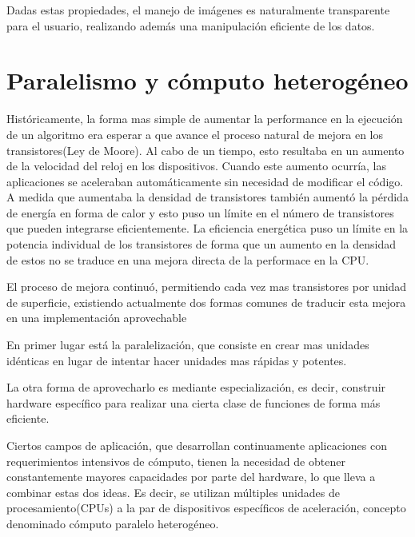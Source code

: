\documentclass[a4paper,10pt]{report}
\begin{document}
Dadas estas propiedades, el manejo de imágenes es naturalmente transparente para el usuario, realizando además una manipulación eficiente de los datos.










\section{Paralelismo y cómputo heterogéneo}



Históricamente, la forma mas simple de aumentar la performance en la ejecución de un algoritmo era esperar a que avance el proceso natural de mejora en los transistores(Ley de Moore).
Al cabo de un tiempo, esto resultaba en un aumento de la velocidad del reloj en los dispositivos. Cuando este aumento ocurría, las aplicaciones se aceleraban automáticamente sin necesidad de modificar el código.
A medida que aumentaba la densidad de transistores también aumentó la pérdida de energía en forma de calor y esto puso un límite en el número de transistores que pueden integrarse eficientemente.
La eficiencia energética puso un límite en la potencia individual de los transistores de forma que un aumento en la densidad de estos no se traduce en una mejora directa
de la performace en la CPU. 

El proceso de mejora continuó, permitiendo cada vez mas transistores por unidad de superficie, existiendo actualmente dos formas comunes de traducir esta mejora en una implementación aprovechable

En primer lugar está la paralelización, que consiste en crear mas unidades idénticas en lugar de intentar hacer unidades mas rápidas y potentes.

La otra forma de aprovecharlo es mediante especialización, es decir, construir hardware específico para realizar una cierta clase de funciones de forma más eficiente.

Ciertos campos de aplicación, que desarrollan continuamente aplicaciones con requerimientos intensivos de cómputo, tienen la necesidad de obtener constantemente mayores capacidades por parte del hardware, lo que lleva a combinar estas dos ideas. Es decir, se utilizan múltiples unidades de procesamiento(CPUs) a la par de dispositivos específicos de aceleración, 
concepto denominado cómputo paralelo heterogéneo.
\end{document}
